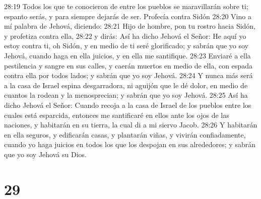 28:19 Todos los que te conocieron de entre los pueblos se maravillarán sobre ti; espanto serás, y para siempre dejarás de ser. 
Profecía contra Sidón  
28:20 Vino a mí palabra de Jehová, diciendo:  
28:21 Hijo de hombre, pon tu rostro hacia Sidón,  y profetiza contra ella,  
28:22 y dirás: Así ha dicho Jehová el Señor: He aquí yo estoy contra ti, oh Sidón, y en medio de ti seré glorificado; y sabrán que yo soy Jehová, cuando haga en ella juicios, y en ella me santifique.  
28:23 Enviaré a ella pestilencia y sangre en sus calles, y caerán muertos en medio de ella, con espada contra ella por todos lados; y sabrán que yo soy Jehová.  
28:24 Y nunca más será a la casa de Israel espina desgarradora, ni aguijón que le dé dolor, en medio de cuantos la rodean y la menosprecian; y sabrán que yo soy Jehová.  
28:25 Así ha dicho Jehová el Señor: Cuando recoja a la casa de Israel de los pueblos entre los cuales está esparcida, entonces me santificaré en ellos ante los ojos de las naciones, y habitarán en su tierra, la cual di a mi siervo Jacob.  
28:26 Y habitarán en ella seguros, y edificarán casas, y plantarán viñas, y vivirán confiadamente, cuando yo haga juicios en todos los que los despojan en sus alrededores; y sabrán que yo soy Jehová su Dios.  

\chapter{29}

